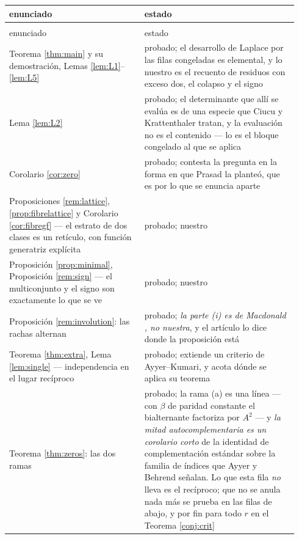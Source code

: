 \documentclass[11pt,reqno]{amsart}
\newcommand{\stproved}{\textcolor{hproved}{\small probado}}
\theoremstyle{plain}
\theoremstyle{definition}
\begin{document}
\begingroup{}\footnotesize\setlength{\tabcolsep}{4.0pt}
\begin{longtable}{@{}>{\raggedright\arraybackslash}p{0.44\linewidth}%
                   >{\raggedright\arraybackslash}p{0.50\linewidth}@{}}
\toprule
enunciado & estado\\
\midrule
\endfirsthead
\multicolumn{2}{@{}l}{\footnotesize\itshape Lo que es nuestro, continuación}\\[1pt]
\toprule
enunciado & estado\\
\midrule
\endhead
Teorema \ref{thm:main} y su demostración, Lemas \ref{lem:L1}--\ref{lem:L5} & \stproved; el desarrollo
de Laplace por las filas congeladas es elemental, y lo nuestro es el recuento de residuos con exceso
dos, el colapso y el signo\\
Lema \ref{lem:L2} & \stproved; el determinante que allí se evalúa es de una especie que Ciucu y
Krattenthaler tratan, y la evaluación no es el contenido --- lo es el bloque congelado al que se
aplica\\
Corolario \ref{cor:zero} & \stproved; contesta la pregunta en la forma en que Prasad la planteó, que
es por lo que se enuncia aparte\\
Proposiciones \ref{rem:lattice}, \ref{prop:fibrelattice} y Corolario \ref{cor:fibregf} --- el estrato
de dos clases es un retículo, con función generatriz explícita & \stproved; nuestro\\
Proposición \ref{prop:minimal}, Proposición \ref{rem:sign} --- el multiconjunto y el signo son
exactamente lo que se ve & \stproved; nuestro\\
Proposición \ref{rem:involution}: las rachas alternan & \stproved; \emph{la parte (i) es de
Macdonald \cite[p.~91]{Mac95}, no nuestra}, y el artículo lo dice donde la proposición está\\
Teorema \ref{thm:extra}, Lema \ref{lem:single} --- independencia en el lugar recíproco & \stproved;
extiende un criterio de Ayyer--Kumari, y acota dónde se aplica su teorema\\
Teorema \ref{thm:zeros}: las dos ramas & \stproved; la rama (a) es una línea --- con $\beta$ de
paridad constante el bialternante factoriza por $A^2$ --- y \emph{la mitad autocomplementaria es un
corolario corto} de la identidad de complementación estándar sobre la familia de índices que Ayyer y
Behrend señalan. Lo que esta fila \emph{no} lleva es el recíproco; que no se anula nada más se prueba en las filas
de abajo, y por fin para todo $r$ en el Teorema \ref{conj:crit}\\

\end{longtable}
\end{document}
